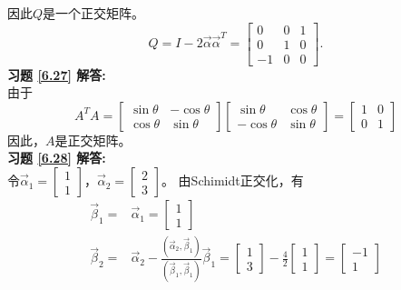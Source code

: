 \documentclass[a4paper]{book}
\begin{document}
因此$Q$是一个正交矩阵。
\begin{equation*}
Q=I-2\vec{\alpha}\vec{\alpha}^T
   =\begin{bmatrix}0&0&1\\0&1&0\\-1&0&0\end{bmatrix}.
\end{equation*}
\textbf{习题 \ref{6.27} 解答:}\\
由于
\begin{equation*}
 A^TA= \begin{bmatrix}\sin\theta&-\cos\theta\\ \cos\theta&\sin\theta\end{bmatrix}
 \begin{bmatrix}\sin\theta&\cos\theta\\-\cos\theta&\sin\theta\end{bmatrix}
 =\begin{bmatrix}1&0\\0&1\end{bmatrix}
\end{equation*}
因此，$A$是正交矩阵。\\
\textbf{习题 \ref{6.28} 解答:}\\
令$\vec{\alpha}_1=\begin{bmatrix}1\\1\end{bmatrix}$，$\vec{\alpha}_2=\begin{bmatrix}2\\3\end{bmatrix}$。
由Schimidt正交化，有\\
\begin{align*}
\vec{\beta}_1=&\vec{\alpha}_1=\begin{bmatrix}1\\1\end{bmatrix}\\
\vec{\beta}_2=&\vec{\alpha}_2-\frac{(\vec{\alpha}_2,\vec{\beta}_1)}{(\vec{\beta}_1,\vec{\beta}_1)}\vec{\beta}_1
             =\begin{bmatrix}1\\3\end{bmatrix}-\frac{4}{2}\begin{bmatrix}1\\1\end{bmatrix}=\begin{bmatrix}-1\\1\end{bmatrix}
\end{align*}
\end{document}
